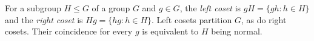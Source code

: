 
For a subgroup $H\le G$ of a group $G$ and $g\in G$, the \emph{left coset} is $gH=\{gh:h\in H\}$ and the \emph{right coset} is $Hg=\{hg:h\in H\}$. Left cosets partition $G$, as do right cosets. Their coincidence for every $g$ is equivalent to $H$ being normal.
